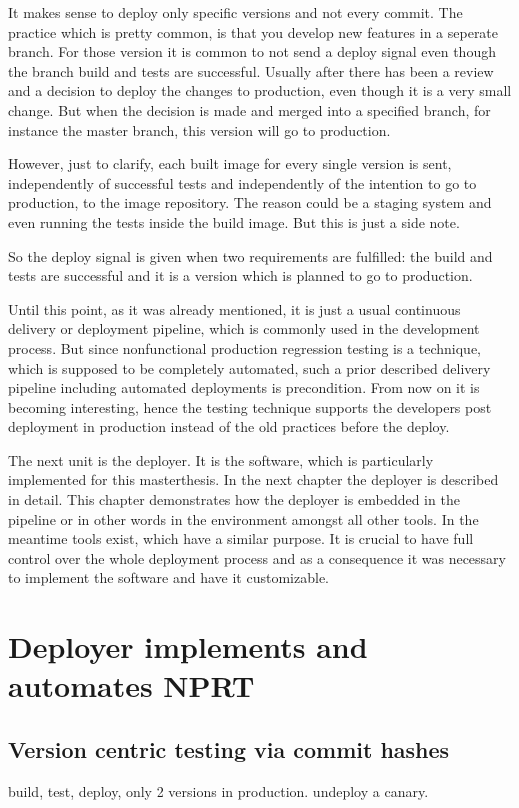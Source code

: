 It makes sense to deploy only specific versions and not every commit. The practice which is pretty common, is that you develop new features in a seperate branch. For those version it is common to not send a deploy signal even though the branch build and tests are successful. Usually after there has been a review and a decision to deploy the changes to production, even though it is a very small change. But when the decision is made and merged into a specified branch, for instance the master branch, this version will go to production.

However, just to clarify, each built image for every single version is sent, independently of successful tests and independently of the intention to go to production, to the image repository. The reason could be a staging system and even running the tests inside the build image. But this is just a side note.

So the deploy signal is given when two requirements are fulfilled: the build and tests are successful and it is a version which is planned to go to production.

Until this point, as it was already mentioned, it is just a usual continuous delivery or deployment pipeline, which is commonly used in the development process. But since nonfunctional production regression testing is a technique, which is supposed to be completely automated, such a prior described delivery pipeline including automated deployments is precondition. From now on it is becoming interesting, hence the testing technique supports the developers post deployment in production instead of the old practices before the deploy.

The next unit is the deployer. It is the software, which is particularly implemented for this masterthesis. In the next chapter the deployer is described in detail. This chapter demonstrates how the deployer is embedded in the pipeline or in other words in the environment amongst all other tools. In the meantime tools exist, which have a similar purpose. It is crucial to have full control over the whole deployment process and as a consequence it was necessary to implement the software and have it customizable.


\chapter{Deployer implements and automates NPRT}
\section{Version centric testing via commit hashes}
build, test, deploy, only 2 versions in production. undeploy a canary.
